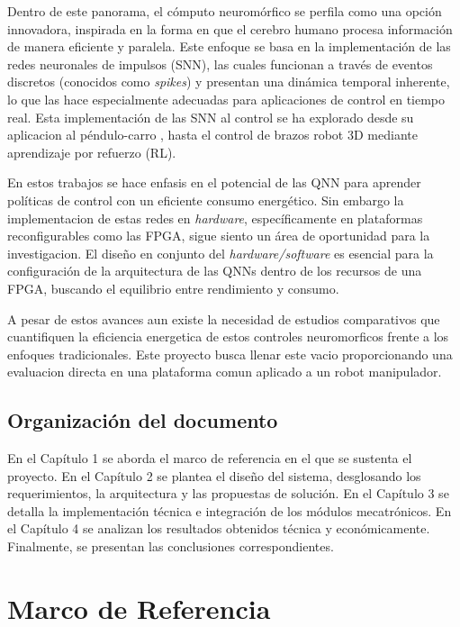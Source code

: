 \documentclass[12pt]{article}
\begin{document}
Dentro de este panorama, el cómputo neuromórfico se perfila como una opción innovadora, inspirada en la forma en que el cerebro humano procesa información de manera eficiente y paralela\cite{Mehonic2022}. Este enfoque se basa en la implementación de las redes neuronales de impulsos (SNN), las cuales funcionan a través de eventos discretos (conocidos como \textit{spikes}) y presentan una dinámica temporal inherente, lo que las hace especialmente adecuadas para aplicaciones de control en tiempo real\cite{Zanatta2024exploring, MAASS19971659}.
Esta implementación de las SNN al control se ha explorado desde su aplicacion al péndulo-carro \cite{Vlasov2023}, hasta el control de brazos robot 3D mediante aprendizaje por refuerzo (RL)\cite{Park2025electronics,Zanatta2024exploring}.

En estos trabajos se hace enfasis en el potencial de las QNN para aprender políticas de control con un eficiente consumo energético. Sin embargo la implementacion de estas redes en \textit{hardware}, específicamente en plataformas reconfigurables como las FPGA, sigue siento un área de oportunidad para la investigacion. El diseño en conjunto del \textit{hardware/software} es esencial para la configuración de la arquitectura de las QNNs dentro de los recursos de una FPGA, buscando el equilibrio entre rendimiento y consumo\cite{Zhang2025jlpea}.

A pesar de estos avances aun existe la necesidad de estudios comparativos que cuantifiquen la eficiencia energetica de estos controles neuromorficos frente a los enfoques tradicionales. Este proyecto busca llenar este vacio proporcionando una evaluacion directa en una plataforma comun aplicado a un robot manipulador.

\subsection*{Organización del documento}
En el Capítulo 1 se aborda el marco de referencia en el que se sustenta el proyecto. En el Capítulo 2 se plantea el diseño del sistema, desglosando los requerimientos, la arquitectura y las propuestas de solución. En el Capítulo 3 se detalla la implementación técnica e integración de los módulos mecatrónicos. En el Capítulo 4 se analizan los resultados obtenidos técnica y económicamente. Finalmente, se presentan las conclusiones correspondientes.


\section{Marco de Referencia}
\end{document}
